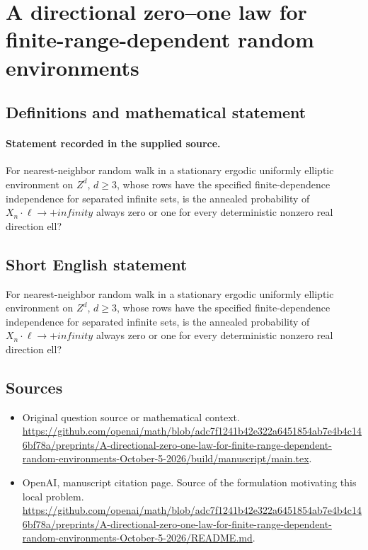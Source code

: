\documentclass[11pt]{article}
\begin{document}
\section*{A directional zero–one law for finite-range-dependent random environments}\label{30007347}
\subsection{Definitions and mathematical statement}
\paragraph{Statement recorded in the supplied source.}
For nearest-neighbor random walk in a stationary ergodic uniformly elliptic environment on $Z^d$, $d\geq 3$, whose rows have the specified finite-dependence independence for separated infinite sets, is the annealed probability of $X_n\cdot \ell \to +infinity$ always zero or one for every deterministic nonzero real direction ell?
\subsection{Short English statement}
For nearest-neighbor random walk in a stationary ergodic uniformly elliptic environment on $Z^d$, $d\geq 3$, whose rows have the specified finite-dependence independence for separated infinite sets, is the annealed probability of $X_n\cdot \ell \to +infinity$ always zero or one for every deterministic nonzero real direction ell?
\subsection{Sources}
\begin{itemize}
\item[S1] Original question source or mathematical context.
\url{https://github.com/openai/math/blob/adc7f1241b42e322a6451854ab7e4b4c146bf78a/preprints/A-directional-zero-one-law-for-finite-range-dependent-random-environments-October-5-2026/build/manuscript/main.tex}.
\item[S2] OpenAI, manuscript citation page. Source of the formulation motivating this local problem.
\url{https://github.com/openai/math/blob/adc7f1241b42e322a6451854ab7e4b4c146bf78a/preprints/A-directional-zero-one-law-for-finite-range-dependent-random-environments-October-5-2026/README.md}.
\end{itemize}
\end{document}
